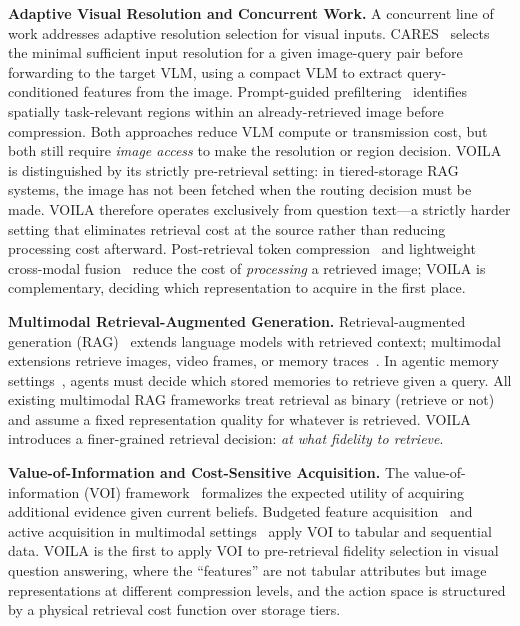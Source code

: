 \noindent\textbf{Adaptive Visual Resolution and Concurrent Work.}
A concurrent line of work addresses adaptive resolution selection for visual inputs.
CARES~\cite{kimhi2025cares} selects the minimal sufficient input resolution for a given image-query pair before forwarding to the target VLM, using a compact VLM to extract query-conditioned features from the image.
Prompt-guided prefiltering~\cite{azizian2026promptguided} identifies spatially task-relevant regions within an already-retrieved image before compression.
Both approaches reduce VLM compute or transmission cost, but both still require \emph{image access} to make the resolution or region decision.
VOILA is distinguished by its strictly pre-retrieval setting: in tiered-storage RAG systems, the image has not been fetched when the routing decision must be made.
VOILA therefore operates exclusively from question text---a strictly harder setting that eliminates retrieval cost at the source rather than reducing processing cost afterward.
Post-retrieval token compression~\cite{weng2024learning} and lightweight cross-modal fusion~\cite{farazi2021accuracy} reduce the cost of \emph{processing} a retrieved image; \textsc{VOILA} is complementary, deciding which representation to acquire in the first place.

\noindent\textbf{Multimodal Retrieval-Augmented Generation.}
Retrieval-augmented generation (RAG)~\cite{lewis2020rag} extends language models with retrieved context; multimodal extensions retrieve images, video frames, or memory traces~\cite{yasunaga2023retrievalaugmented, chen2022murag}.
In agentic memory settings~\cite{park2023generative, wang2024locomo}, agents must decide which stored memories to retrieve given a query.
All existing multimodal RAG frameworks treat retrieval as binary (retrieve or not) and assume a fixed representation quality for whatever is retrieved.
\textsc{VOILA} introduces a finer-grained retrieval decision: \emph{at what fidelity to retrieve}.

\noindent\textbf{Value-of-Information and Cost-Sensitive Acquisition.}
The value-of-information (VOI) framework~\cite{bilgic2011value} formalizes the expected utility of acquiring additional evidence given current beliefs.
Budgeted feature acquisition~\cite{karkkainen2019cost} and active acquisition in multimodal settings~\cite{kossen2022active} apply VOI to tabular and sequential data.
VOILA is the first to apply VOI to pre-retrieval fidelity selection in visual question answering, where the ``features'' are not tabular attributes but image representations at different compression levels, and the action space is structured by a physical retrieval cost function over storage tiers.

